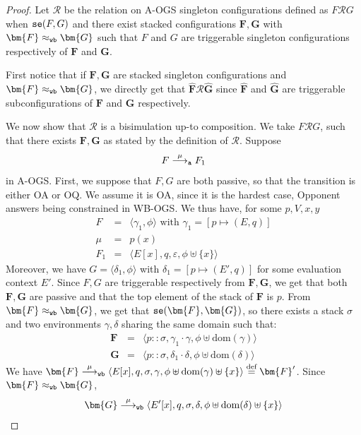 \documentclass[11pt,a4paper]{amsart}
\theoremstyle{plain}
\theoremstyle{definition}
\theoremstyle{defC}
\theoremstyle{thmC}
\theoremstyle{plain}
\numberwithin{equation}{section}
\newcommand{\stt}{\sigma}
\newcommand{\AOGS}{\mbox{{\rm A-OGS}}\xspace}      %
\newcommand{\WBOGS}{\mbox{{\rm WB-OGS}}\xspace}      %
\newcommand{\okC}[2]{{\tt se}(#1,#2)}  %
\newcommand{\Ep}{E'}              %
\newcommand{\rmm}[1]{{\tt{\lowercase{#1}}}}
\newcommand{\genarr}[2]{\mathrel{\stackrel{{#1}}{\longrightarrow}_{\rmm{\lowercase{#2}}}}}
\newcommand{\arrA}[1]{\genarr{#1}{A}}  %
\newcommand{\arrWB}[1]{\genarr{#1}{WB}}           %
\newcommand{\genwb}[1]{\mathrel{\approx_{\rmm{\lowercase{#1}}}}}       %
\newcommand{\wbWB}{\genwb{wb}}       %
\def\R{{\mathcal R}}
\def\RR{\mathrel{\mathcal R}}
\def\defi{\stackrel{\mbox{\scriptsize {\rm{def}}}}{=}} %
\newcommand{\FF}{F}
\newcommand{\GG}{G}
\newcommand{\FFb}{{\bm{\FF}}} %
\newcommand{\GGb}{{\bm{\GG}}} %
\newcommand{\es}{\eraseStack}
\newcommand{\dom}[1]{\mathrm{dom}(#1)}
\newcommand{\emptymap}{\varepsilon}
\newcommand{\pmap}[2]{[#1 \mapsto #2]}
\newcommand{\act}{\mu}
\newcommand{\ansO}[2]{#1(#2)}
\newcommand{\conf}[1]{\langle #1\rangle}
\newcommand{\eraseStack}[1]{\widehat{#1}}
\theoremstyle{plain}
\theoremstyle{definition}
\begin{document}
\begin{proof}
  Let $\R$ be the relation on \AOGS singleton configurations
  defined as $\FF \RR \GG$ when
   $\okC \FF\GG$ and there exist stacked configurations $\FFb, \GGb$
    with $\FFb \wbWB \GGb$ such that 
    $\FF$ and $\GG$ are triggerable singleton configurations
    respectively of $\FFb$ and $\GGb$.

  First notice that if $\FFb, \GGb$ are stacked singleton configurations and 
  $\FFb \wbWB \GGb$, we directly get that 
  $\es\FFb \RR \es\GGb$ since $\es\FFb$ and $\es\GGb$ are 
  triggerable subconfigurations of $\FFb$ and $\GGb$ respectively.
  
  We now show that $\R$ is a bisimulation up-to composition.
  We take $\FF \RR \GG$, such that there exists $\FFb, \GGb$
  as stated by the definition of $\R$.
  Suppose 
  \begin{equation}
  \label{e:arrA-left}
   \FF \arrA{\act} \FF_1 
  \end{equation} 
  in \AOGS.  
  First, we suppose that $\FF,\GG$ are both passive, 
  so that the transition is either OA or OQ.  
  We assume it is OA, since it is the hardest case, 
  Opponent answers being constrained in \WBOGS.
  We thus have, for some $p,V,x,y$ 
  \[\begin{array}{rcl}
   \FF &=&  \conf{ \gamma_1, \phi} \mbox{ with }  \gamma_1 = \pmap{p}{(E,q)} \\
   \act & = & \ansO{p}{x} \\
   \FF_1 & = & \conf{E[x],q, \emptymap,\phi \uplus \{x\}}
  \end{array}\]
  Moreover, we have $\GG = \conf{\delta_1, \phi}$ 
  with $\delta_1 = \pmap{p}{(\Ep,q)}$ for some evaluation context $\Ep$.
  Since $\FF,\GG$ are triggerable respectively from $\FFb,\GGb$,
  we get that both $\FFb,\GGb$ are passive
  and that the top element of the stack of $\FFb$ is $p$.
  From $\FFb \wbWB \GGb$, we get that $\okC{\FFb}{\GGb}$,
  so there exists a stack $\stt$ and two environments $\gamma, \delta$ sharing the same domain such that:  
  \[\begin{array}{rcl}
  \FFb & = & \conf{p::\stt,\gamma_1 \cdot \gamma,\phi \uplus \dom{\gamma}} \\ 
  \GGb & = & \conf{p::\stt,\delta_1 \cdot \delta,\phi \uplus \dom{\delta}} 
  \end{array}\]
  We have 
  $\FFb \arrWB{\act} \conf{E[x],q,\sigma, \gamma, \phi\uplus \dom{\gamma} \uplus \{x\}} 
  \defi \FFb'$. 
  Since $\FFb \wbWB \GGb$, 
  \[\GGb  \arrWB{\act} \conf{E'[x],q,\sigma, \delta, \phi \uplus \dom{\delta} \uplus \{x\}}  
\]
\end{proof}
\end{document}

